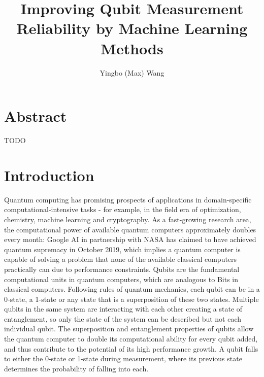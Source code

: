 \documentclass[letterpaper,twocolumn,10pt]{article}
\begin{document}
\title{Improving Qubit Measurement Reliability by Machine Learning Methods}

\author{Yingbo (Max) Wang}

\maketitle

\section{Abstract}

TODO

\section{Introduction}

Quantum computing has promising prospects of applications in domain-specific computational-intensive tasks - for example, in the field era of optimization, chemistry, machine learning and cryptography. As a fast-growing research area, the computational power of available quantum computers approximately doubles every month: Google AI in partnership with NASA has claimed to have achieved quantum supremacy in October 2019, which implies a quantum computer is capable of solving a problem that none of the available classical computers practically can due to performance constraints. Qubits are the fundamental computational units in quantum computers, which are analogous to Bits in classical computers. Following rules of quantum mechanics, each qubit can be in a 0-state, a 1-state or any state that is a superposition of these two states. Multiple qubits in the same system are interacting with each other creating a state of entanglement, so only the state of the system can be described but not each individual qubit. The superposition and entanglement properties of qubits allow the quantum computer to double its computational ability for every qubit added, and thus contribute to the potential of its high performance growth. A qubit falls to either the 0-state or 1-state during measurement, where its previous state determines the probability of falling into each. 
\end{document}
